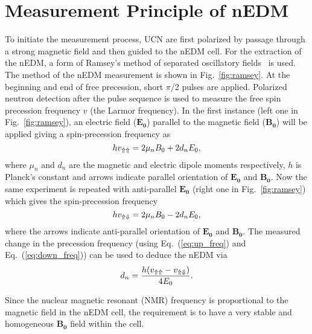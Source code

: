 \section{Measurement Principle of nEDM}\label{sec:nEDM}
To initiate the measurement process, UCN are first polarized by passage through a strong magnetic field and then guided to the nEDM cell. For the extraction of the nEDM, a form of Ramsey's method of separated oscillatory fields~\cite{ramsey} is used. 
The method of the nEDM measurement is shown in Fig.~\ref{fig:ramsey}. At the beginning and end of free precession, short $\pi$/2 pulses are applied. Polarized neutron detection after the pulse sequence is used to measure the free spin precession frequency $v$ (the Larmor frequency). In the first instance (left one in Fig.~\ref{fig:ramsey}), an electric field ($\bm{E_0}$) parallel to the magnetic field ($\bm{B_0}$) will be applied giving a spin-precession frequency as
\begin{equation}\label{eq:up_freq}
    h v_{\Uparrow \Uparrow}=2\mu_n B_0+2 d_n E_0{\rm ,}
\end{equation}
where $\mu_n$ and $d_n$ are the magnetic and electric dipole moments respectively, $h$ is Planck's constant and arrows indicate parallel orientation of $\bm{E_0}$ and $\bm{B_0}$.
Now the same experiment is repeated with anti-parallel $\bm{E_0}$ (right one in Fig.~\ref{fig:ramsey}) which gives the spin-precession frequency
\begin{equation}\label{eq:down_freq}
    h v_{\Uparrow \Downarrow}=2\mu_n B_0-2 d_n E_0{\rm ,}
\end{equation}
where the arrows indicate anti-parallel orientation of $\bm{E_0}$ and $\bm{B_0}$.
The measured change in the precession frequency (using Eq.~(\ref{eq:up_freq}) and Eq.~(\ref{eq:down_freq})) can be used to deduce the nEDM via
\begin{equation}\label{eq:nEDM}
    d_n=\frac{h (v_{\Uparrow \Uparrow}-v_{\Uparrow \Downarrow})}{4 E_0}{\rm .}
\end{equation}

Since the nuclear magnetic resonant (NMR) frequency is proportional to the magnetic field in the nEDM cell, the requirement is to have a very stable and homogeneous $\bm{B_0}$ field within the cell.


